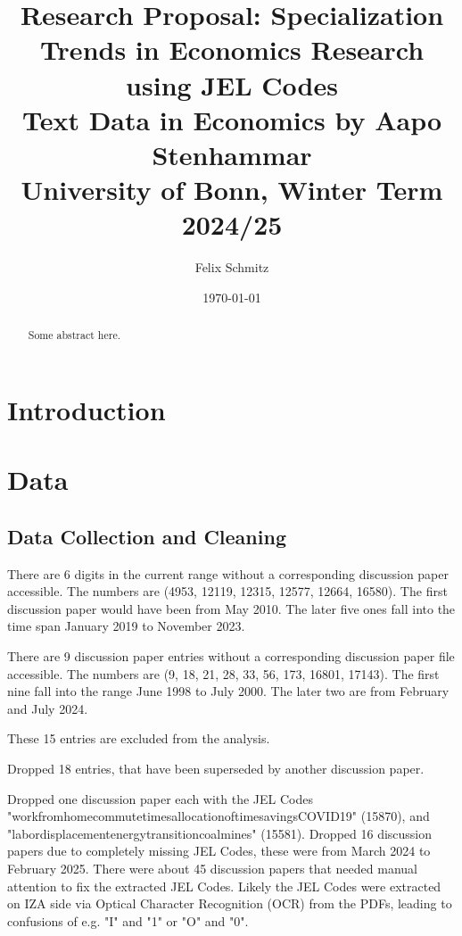 \documentclass[11pt, a4paper, leqno]{article}
\begin{document}
\title{Research Proposal: Specialization Trends in Economics Research using JEL Codes \\
Text Data in Economics by Aapo Stenhammar \\
University of Bonn, Winter Term 2024/25}

\author{Felix Schmitz\footnotemark[1]}

\date{
    \today
}

\maketitle
{}

\begin{abstract}
    Some abstract here.
\end{abstract}

\clearpage

\section{Introduction}

\section{Data}

\subsection{Data Collection and Cleaning}

There are 6 digits in the current range without a corresponding discussion paper accessible.
The numbers are (4953, 12119, 12315, 12577, 12664, 16580).
The first discussion paper would have been from May 2010.
The later five ones fall into the time span January 2019 to November 2023.

There are 9 discussion paper entries without a corresponding discussion paper file accessible.
The numbers are (9, 18, 21, 28, 33, 56, 173, 16801, 17143).
The first nine fall into the range June 1998 to July 2000.
The later two are from February and July 2024.

These 15 entries are excluded from the analysis.

Dropped 18 entries, that have been superseded by another discussion paper.

Dropped one discussion paper each with the JEL Codes "workfromhomecommutetimesallocationoftimesavingsCOVID19" (15870), and
"labordisplacementenergytransitioncoalmines" (15581).
Dropped 16 discussion papers due to completely missing JEL Codes, these were from March 2024 to February 2025.
There were about 45 discussion papers that needed manual attention to fix the extracted JEL Codes.
Likely the JEL Codes were extracted on IZA side via Optical Character Recognition (OCR) from the PDFs, leading to confusions of e.g. "I" and "1" or "O" and "0".
\end{document}
